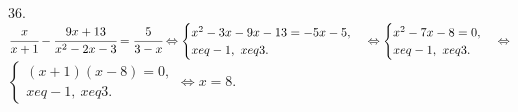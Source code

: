36. $\cfrac{x}{x+1}-\cfrac{9x+13}{x^2-2x-3}=\cfrac{5}{3-x}\Leftrightarrow \begin{cases} x^2-3x-9x-13=-5x-5,\\ x
eq-1,\ x
eq3.\end{cases}
\Leftrightarrow \begin{cases} x^2-7x-8=0,\\ x
eq-1,\ x
eq3.\end{cases}
\Leftrightarrow$\\$\begin{cases} (x+1)(x-8)=0,\\ x
eq-1,\ x
eq3.\end{cases}\Leftrightarrow x=8.$\\
